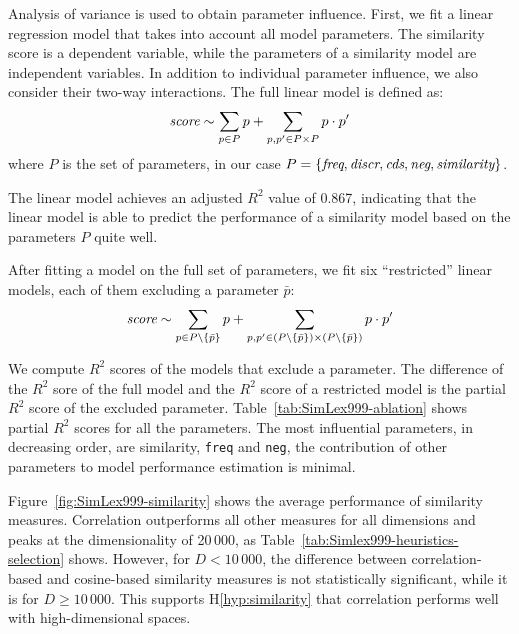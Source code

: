 Analysis of variance is used to obtain parameter influence. First, we fit a linear regression model that takes into account all model parameters. The similarity score is a dependent variable, while the parameters of a similarity model are independent variables. In addition to individual parameter influence, we also consider their two-way interactions. The full linear model is defined as:
\begin{equation}
  \text{\it score} \sim \sum_{p \in P}p + \sum_{p, p' \in P \times P}p \cdot p'
\end{equation}
where $P$ is the set of parameters, in our case $P = \{\text{\it freq}, \text{\it discr}, \text{\it cds}, \text{\it neg}, \text{\it similarity} \}$.

The linear model achieves an adjusted $R^2$ value of 0.867, indicating that the linear model is able to predict the performance of a similarity model based on the parameters $P$ quite well.

After fitting a model on the full set of parameters,  we fit six ``restricted'' linear models, each of them excluding a parameter $\bar p$:
\begin{equation}
  \text{\it score} \sim \sum_{p \in P \setminus \{\bar p\} }p + \sum_{p, p' \in (P \setminus \{\bar p\}) \times (P \setminus \{\bar p\})}p \cdot p'
\end{equation}





We compute $R^2$ scores of the models that exclude a parameter. The difference of the $R^2$ sore of the full model and the $R^2$ score of a restricted model is the partial $R^2$ score of the excluded parameter. Table~\ref{tab:SimLex999-ablation} shows partial $R^2$ scores for all the parameters. The most influential parameters, in decreasing order, are similarity, \texttt{freq} and \texttt{neg}, the contribution of other parameters to model performance estimation is minimal.


Figure~\ref{fig:SimLex999-similarity} shows the average performance of similarity measures. Correlation outperforms all other measures for all dimensions and peaks at the dimensionality of 20\,000, as Table~\ref{tab:Simlex999-heuristics-selection} shows. However, for $D < 10\,000$, the difference between correlation-based and cosine-based similarity measures is not statistically significant, while it is for $D \ge 10\,000$. This supports H\ref{hyp:similarity} that correlation performs well with high-dimensional spaces.

